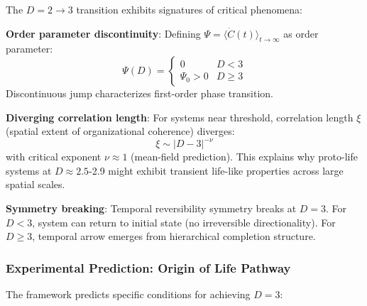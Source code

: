 \documentclass[11pt]{article}
\begin{document}
The $D = 2 \to 3$ transition exhibits signatures of critical phenomena:

\textbf{Order parameter discontinuity}: Defining $\Psi = \langle \dot{C}(t) \rangle_{t \to \infty}$ as order parameter:
\begin{equation}
\Psi(D) = \begin{cases}
0 & D < 3 \\
\Psi_0 > 0 & D \geq 3
\end{cases}
\end{equation}
Discontinuous jump characterizes first-order phase transition.

\textbf{Diverging correlation length}: For systems near threshold, correlation length $\xi$ (spatial extent of organizational coherence) diverges:
\begin{equation}
\xi \sim |D - 3|^{-\nu}
\end{equation}
with critical exponent $\nu \approx 1$ (mean-field prediction). This explains why proto-life systems at $D \approx 2.5$-2.9 might exhibit transient life-like properties across large spatial scales.

\textbf{Symmetry breaking}: Temporal reversibility symmetry breaks at $D = 3$. For $D < 3$, system can return to initial state (no irreversible directionality). For $D \geq 3$, temporal arrow emerges from hierarchical completion structure.

\subsubsection{Experimental Prediction: Origin of Life Pathway}

The framework predicts specific conditions for achieving $D = 3$:
\end{document}
